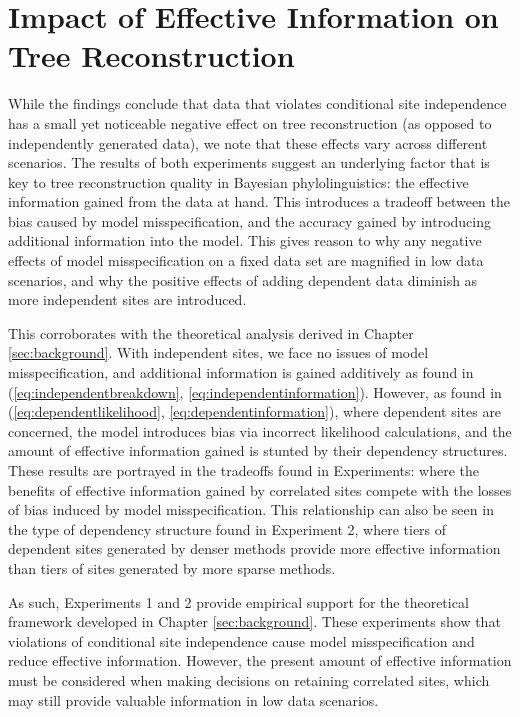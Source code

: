 \section{Impact of Effective Information on Tree Reconstruction}
While the findings conclude that data that violates conditional site independence has a small yet noticeable negative effect on tree reconstruction (as opposed to independently generated data), we note that these effects vary across different scenarios. The results of both experiments suggest an underlying factor that is key to tree reconstruction quality in Bayesian phylolinguistics: the effective information gained from the data at hand. This introduces a tradeoff between the bias caused by model misspecification, and the accuracy gained by introducing additional information into the model. This gives reason to why any negative effects of model misspecification on a fixed data set are magnified in low data scenarios, and why the positive effects of adding dependent data diminish as more independent sites are introduced.

This corroborates with the theoretical analysis derived in Chapter \ref{sec:background}. With independent sites, we face no issues of model misspecification, and additional information is gained additively as found in (\ref{eq:independentbreakdown}, \ref{eq:independentinformation}). However, as found in (\ref{eq:dependentlikelihood}, \ref{eq:dependentinformation}), where dependent sites are concerned, the model introduces bias via incorrect likelihood calculations, and the amount of effective information gained is stunted by their dependency structures. These results are portrayed in the tradeoffs found in Experiments: where the benefits of effective information gained by correlated sites compete with the losses of bias induced by model misspecification. This relationship can also be seen in the type of dependency structure found in Experiment 2, where tiers of dependent sites generated by denser methods provide more effective information than tiers of sites generated by more sparse methods.

As such, Experiments 1 and 2 provide empirical support for the theoretical framework developed in Chapter \ref{sec:background}. These experiments show that violations of conditional site independence cause model misspecification and reduce effective information. However, the present amount of effective information must be considered when making decisions on retaining correlated sites, which may still provide valuable information in low data scenarios.

